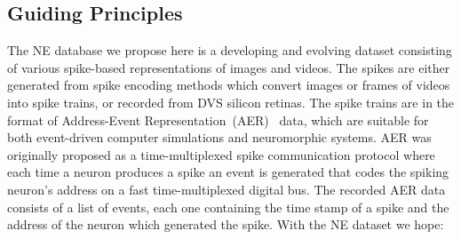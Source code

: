 \subsection{Guiding Principles}
The NE database we propose here is a developing and evolving dataset consisting of various spike-based representations of images and videos.
The spikes are either generated from spike encoding methods which convert images or frames of videos into spike trains, or recorded from DVS silicon retinas.
The spike trains are in the format of Address-Event Representation~(AER)~\citep{mahowald1992vlsi} data, which are suitable for both event-driven computer simulations and neuromorphic systems.
AER was originally proposed as a time-multiplexed spike communication protocol where each time a neuron produces a spike an event is generated that codes the spiking neuron's address on a fast time-multiplexed digital bus.
The recorded AER data consists of a list of events, each one containing the time stamp of a spike and the address of the neuron which generated the spike.
With the NE dataset we hope:
